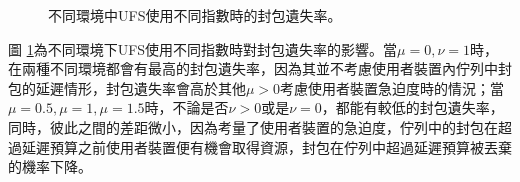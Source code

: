 \begin{figure}[H]
\centering
{}
\caption{\label{fig:UFS_PLR}不同環境中UFS使用不同指數時的封包遺失率。}
\end{figure}
圖 \ref{fig:UFS_PLR}為不同環境下UFS使用不同指數時對封包遺失率的影響。當$\mu=0,\nu=1$時，在兩種不同環境都會有最高的封包遺失率，因為其並不考慮使用者裝置內佇列中封包的延遲情形，封包遺失率會高於其他$\mu > 0$考慮使用者裝置急迫度時的情況；當$\mu=0.5,\mu=1,\mu=1.5$時，不論是否$\nu>0$或是$\nu=0$，都能有較低的封包遺失率，同時，彼此之間的差距微小，因為考量了使用者裝置的急迫度，佇列中的封包在超過延遲預算之前使用者裝置便有機會取得資源，封包在佇列中超過延遲預算被丟棄的機率下降。
